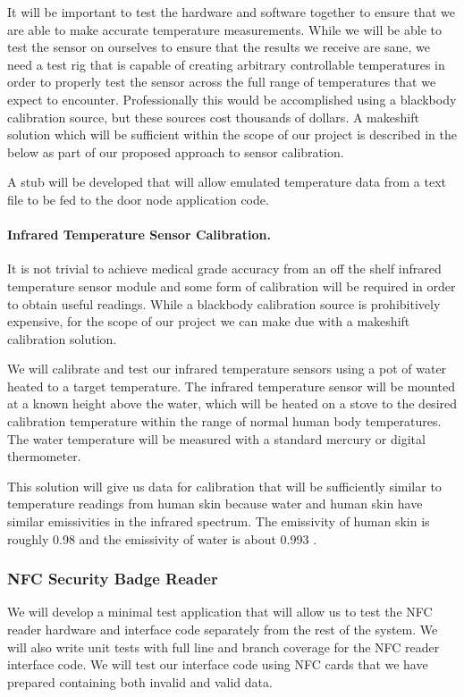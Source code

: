 It will be important to test the hardware and software together to ensure that
we are able to make accurate temperature measurements. While we will be able to
test the sensor on ourselves to ensure that the results we receive are sane, we
need a test rig that is capable of creating arbitrary controllable temperatures
in order to properly test the sensor across the full range of temperatures that
we expect to encounter. Professionally this would be accomplished using a
blackbody calibration source, but these sources cost thousands of dollars. A
makeshift solution which will be sufficient within the scope of our project is
described in the below as part of our proposed approach to sensor calibration.

A stub will be developed that will allow emulated temperature data from a text
file to be fed to the door node application code.

\paragraph{Infrared Temperature Sensor Calibration.}
It is not trivial to achieve medical grade accuracy from an off the shelf
infrared temperature sensor module and some form of calibration will be required
in order to obtain useful readings. While a blackbody calibration source is
prohibitively expensive, for the scope of our project we can make due with a
makeshift calibration solution.

We will calibrate and test our infrared temperature sensors using a pot of water
heated to a target temperature. The infrared temperature sensor will be mounted
at a known height above the water, which will be heated on a stove to the
desired calibration temperature within the range of normal human body
temperatures. The water temperature will be measured with a standard mercury or
digital thermometer.

This solution will give us data for calibration that will be sufficiently
similar to temperature readings from human skin because water and human skin
have similar emissivities in the infrared spectrum. The emissivity of human skin
is roughly 0.98 \cite{Steketee_1973} and the emissivity of water is about 0.993
\cite{Buettner_1965}.

\subsubsection{NFC Security Badge Reader}

We will develop a minimal test application that will allow us to test the NFC
reader hardware and interface code separately from the rest of the system. We
will also write unit tests with full line and branch coverage for the NFC reader
interface code. We will test our interface code using NFC cards that we have
prepared containing both invalid and valid data.

